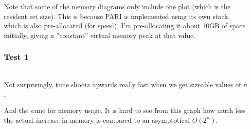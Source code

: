 \documentclass[a4paper, titlepage]{article}
\begin{document}
Note that some of the memory diagrams only include one plot (which is the resident set size). This is because PARI is implemented using its own stack, which is also pre-allocated (for speed). I'm pre-allocating it about 10GB of space initially, giving a ''constant'' virtual memory peak at that value.

\subsubsection{Test 1}
\vspace{3mm}
\begin{center}
\\
Not surprisingly, time shoots upwards really fast when we get sizeable values of $n$.\\
\vspace{4mm}
\end{center}
And the same for memory usage. It is hard to see from this graph how much less the actual increase in memory is compared to an asymptotical $O(2^n)$.
\end{document}

